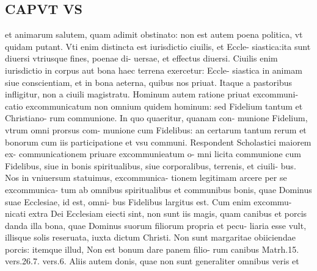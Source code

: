 \documentclass{article}
\begin{document}
\begin{pages}
\section*{CAPVT  VS }
\marginpar{[ p.401 ]}\pstart et animarum salutem, quam adimit obstinato: non est autem poena politica, vt quidam putant. Vti enim distincta est iurisdictio ciuilis, et Eccle- siastica:ita sunt diuersi vtriusque fines, poenae di- uersae, et effectus diuersi. Ciuilis enim iurisdictio in corpus aut bona haec terrena exercetur: Eccle- siastica in animam siue conscientiam, et in bona aeterna, quibus nos priuat. Itaque a pastoribus infligitur, non a ciuili magistratu. Hominum autem ratione priuat excommuni- catio excommunicatum non omnium quidem hominum: sed Fidelium tantum et Christiano- rum communione. In quo quaeritur, quanam con- munione Fidelium, vtrum omni prorsus com- munione cum Fidelibus: an certarum tantum rerum et bonorum cum iis participatione et vsu communi. Respondent Scholastici maiorem ex- communicationem priuare excommunieatum o- mni licita communione cum Fidelibus, siue in bonis spiritualibus, siue corporalibus, terrenis, et ciuili- bus. Nos in vniuersum statuimus, excommunica- tionem legitimam arcere per se excommunica- tum ab omnibus spiritualibus et communibus bonis, quae Dominus suae Ecclesiae, id est, omni- bus Fidelibus largitus est. Cum enim excommu- nicati extra Dei Ecclesiam eiecti sint, non sunt iis magis, quam canibus et porcis danda illa bona, quae Dominus suorum filiorum propria et pecu- liaria esse vult, illisque solis reseruata, iuxta dictum Christi. Non sunt margaritae obiiciendae porcis: itemque illud, Non est bonum dare panem filio- rum canibus Matrh.15. vers.26.7. vers.6. Aliis autem donis, quae non sunt generaliter omnibus veris et  \pend

\end{pages}
\end{document}
